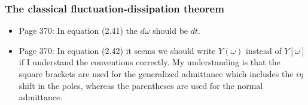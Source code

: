 \subsubsection{The classical fluctuation-dissipation theorem}

\begin{itemize}

\item Page 370: In equation (2.41) the $d\omega$ should be $dt$.

\item Page 370: In equation (2.42) it seems we should write $Y(\omega)$ instead of $Y[\omega]$ if I understand the conventions correctly. My understanding is that the square brackets are used for the generalized admittance which includes the $i\eta$ shift in the poles, whereas the parentheses are used for the normal admittance.

\end{itemize}
